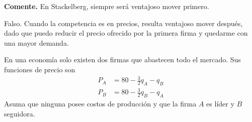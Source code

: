 \question \textbf{Comente.} En Stackelberg, siempre será ventajoso mover primero.
\begin{solution}
Falso. Cuando la competencia es en precios, resulta ventajoso mover después, dado que puedo reducir el precio ofrecido por la primera firma y quedarme con una mayor demanda.

\end{solution}

\question En una economía solo existen dos firmas que abastecen todo el mercado. Sus funciones de precio son
\begin{align*}
  P_A &= 80 - \tfrac{3}{2}q_A - q_B \\
  P_B &= 80 - \tfrac{3}{2}q_B - q_A
\end{align*}
Asuma que ninguna posee costos de producción y que la firma $A$ es líder y $B$ seguidora.
